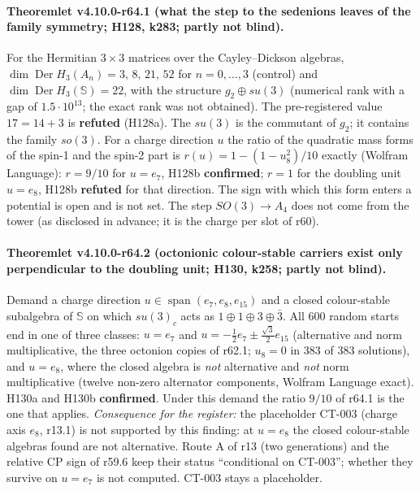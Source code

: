 \paragraph{Theoremlet v4.10.0-r64.1 (what the step to the sedenions leaves of the family symmetry; H128, k283; partly not blind).}
For the Hermitian \(3\times3\) matrices over the Cayley--Dickson algebras, \(\dim\operatorname{Der}H_3(A_n)=3,\,8,\,21,\,52\) for
\(n=0,\dots,3\) (control) and \(\dim\operatorname{Der}H_3(\mathbb S)=22\), with the structure \(g_2\oplus su(3)\) (numerical rank with a gap of
\(1.5\cdot10^{13}\); the exact rank was not obtained).  The pre-registered value \(17=14+3\) is \textbf{refuted} (H128a).  The \(su(3)\) is the
commutant of \(g_2\); it contains the family \(so(3)\).  For a charge direction \(u\) the ratio of the quadratic mass forms of the spin-1 and the
spin-2 part is \(r(u)=1-(1-u_8^2)/10\) exactly (Wolfram Language): \(r=9/10\) for \(u=e_7\), H128b \textbf{confirmed}; \(r=1\) for the doubling
unit \(u=e_8\), H128b \textbf{refuted} for that direction.  The sign with which this form enters a potential is open and is not set.  The step
\(SO(3)\to A_4\) does not come from the tower (as disclosed in advance; it is the charge per slot of r60).

\paragraph{Theoremlet v4.10.0-r64.2 (octonionic colour-stable carriers exist only perpendicular to the doubling unit; H130, k258; partly not blind).}
Demand a charge direction \(u\in\operatorname{span}(e_7,e_8,e_{15})\) and a closed colour-stable subalgebra of \(\mathbb S\) on which
\(su(3)_c\) acts as \(1\oplus1\oplus3\oplus\bar3\).  All 600 random starts end in one of three classes: \(u=e_7\) and
\(u=-\tfrac12e_7\pm\tfrac{\sqrt3}{2}e_{15}\) (alternative and norm multiplicative, the three octonion copies of r62.1; \(u_8=0\) in 383 of 383
solutions), and \(u=e_8\), where the closed algebra is \emph{not} alternative and \emph{not} norm multiplicative (twelve non-zero alternator
components, Wolfram Language exact).  H130a and H130b \textbf{confirmed}.  Under this demand the ratio \(9/10\) of r64.1 is the one that applies.
\emph{Consequence for the register:} the placeholder CT-003 (charge axis \(e_8\), r13.1) is not supported by this finding: at \(u=e_8\)
the closed colour-stable algebras found are not alternative.  Route A of r13 (two generations) and the relative CP sign of r59.6 keep their status ``conditional on
CT-003''; whether they survive on \(u=e_7\) is not computed.  CT-003 stays a placeholder.

